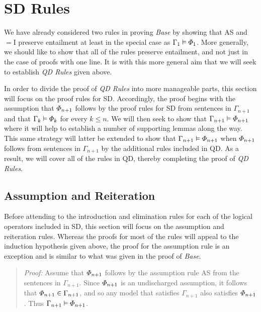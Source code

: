\section{SD Rules}%
  \label{sec:SDRules}

We have already considered two rules in proving \textit{Base} by showing that AS and $=$I preserve entailment at least in the special case as $\Gamma_1 \vDash \varPhi_1$.
More generally, we should like to show that all of the rules preserve entailment, and not just in the case of proofs with one line.
It is with this more general aim that we will seek to establish \textit{QD Rules} given above.

In order to divide the proof of \textit{QD Rules} into more manageable parts, this section will focus on the proof rules for SD. 
Accordingly, the proof begins with the assumption that $\varPhi_{n+1}$ follows by the proof rules for SD from sentences in $\Gamma_{n+1}$ and that $\Gamma_k \vDash \varPhi_k$ for every $k\leq n$.
We will then seek to show that $\Gamma_{n+1} \vDash \varPhi_{n+1}$ where it will help to establish a number of supporting lemmas along the way.
This same strategy will latter be extended to show that $\Gamma_{n+1} \vDash \varPhi_{n+1}$ when $\varPhi_{n+1}$ follows from sentences in $\Gamma_{n+1}$ by the additional rules included in QD.
As a result, we will cover all of the rules in QD, thereby completing the proof of \textit{QD Rules}.






\subsection{Assumption and Reiteration}%
  \label{sub:AssumptionRule}

Before attending to the introduction and elimination rules for each of the logical operators included in SD, this section will focus on the assumption and reiteration rules.
Whereas the proofs for most of the rules will appeal to the induction hypothesis given above, the proof for the assumption rule is an exception and is similar to what was given in the proof of \textit{Base}. 


\begin{quote} 
  \textit{Proof:} Assume that $\varPhi_{n+1}$ follows by the assumption rule AS from the sentences in $\Gamma_{n+1}$.
  Since $\varPhi_{n+1}$ is an undischarged assumption, it follows that $\varPhi_{n+1}\in\Gamma_{n+1}$, and so any model that satisfies $\Gamma_{n+1}$ also satisfies $\varPhi_{n+1}$. 
  Thus $\Gamma_{n+1} \vDash \varPhi_{n+1}$.
\end{quote}

